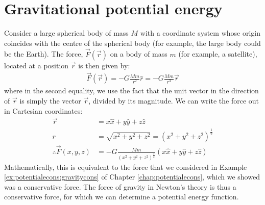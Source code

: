 \section{Gravitational potential energy}
Consider a large spherical body of mass $M$ with a coordinate system whose origin coincides with the centre of the spherical body (for example, the large body could be the Earth). The force, $\vec F(\vec r)$ on a body of mass $m$ (for example, a satellite), located at a position $\vec r$ is then given by:
\begin{align*}
\vec F(\vec r) = - G\frac{Mm}{r^2}\hat r=- G\frac{Mm}{r^3}\vec r
\end{align*}
where in the second equality, we use the fact that the unit vector in the direction of $\vec r$ is simply the vector $\vec r$, divided by its magnitude. We can write the force out in Cartesian coordinates:
\begin{align*}
\vec r &= x\hat x + y \hat y + z\hat z\\
r &= \sqrt{x^2+y^2+z^2} =(x^2+y^2+z^2)^\frac{1}{2} \\
\therefore \vec F(x,y,z) &= - G\frac{Mm}{(x^2+y^2+z^2)^\frac{3}{2} }(x\hat x + y \hat y + z\hat z)
\end{align*}
Mathematically, this is equivalent to the force that we considered in Example \ref{ex:potentialecons:gravitycons} of Chapter \ref{chap:potentialecons}, which we showed was a conservative force. The force of gravity in Newton's theory is thus a conservative force, for which we can determine a potential energy function.

